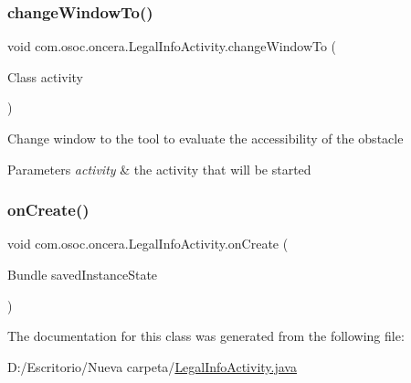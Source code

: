 \subsubsection{\texorpdfstring{changeWindowTo()}{changeWindowTo()}}
{\footnotesize\ttfamily void com.\+osoc.\+oncera.\+Legal\+Info\+Activity.\+change\+Window\+To (\begin{DoxyParamCaption}\item[{Class}]{activity }\end{DoxyParamCaption})}

Change window to the tool to evaluate the accessibility of the obstacle 
\begin{DoxyParams}{Parameters}
{\em activity} & the activity that will be started \\
\hline
\end{DoxyParams}
\mbox{\label{classcom_1_1osoc_1_1oncera_1_1_legal_info_activity_abe501f63ff9839ff8948405fce159e0a}} 
\subsubsection{\texorpdfstring{onCreate()}{onCreate()}}
{\footnotesize\ttfamily void com.\+osoc.\+oncera.\+Legal\+Info\+Activity.\+on\+Create (\begin{DoxyParamCaption}\item[{Bundle}]{saved\+Instance\+State }\end{DoxyParamCaption})\hspace{0.3cm}{\ttfamily [protected]}}



The documentation for this class was generated from the following file\+:\begin{DoxyCompactItemize}
\item 
D\+:/\+Escritorio/\+Nueva carpeta/\mbox{\hyperlink{_legal_info_activity_8java}{Legal\+Info\+Activity.\+java}}\end{DoxyCompactItemize}
